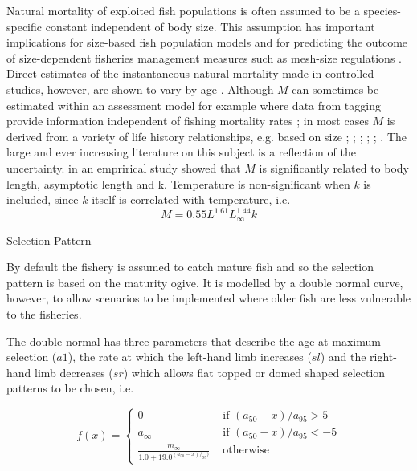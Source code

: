 \documentclass[preprint,review,12pt]{elsarticle}
\begin{document}
Natural mortality of exploited fish populations is often assumed to be a species-specific constant independent of body size. This assumption has important implications for size-based fish population models and for predicting the outcome of size-dependent fisheries management measures such as mesh-size regulations \cite{gislason2010does}. Direct estimates of the instantaneous natural mortality made in controlled studies, however, are shown to vary by age \cite{lorenzen2002density}. Although $M$ can sometimes be estimated within an assessment model for example where data from tagging provide information independent of fishing mortality rates \cite{haist1997integrated}; \cite{pine2003review} in most cases $M$ is derived from a variety of life history relationships, e.g. based on size \cite{jensen1985comparison}; \cite{griffiths2007natural}; \cite{gunderson1988reproductive}; \cite{hoenig1983empirical}; \cite{gunderson1980using}; \cite{hewitt2005comparison}. The large and ever increasing literature on this subject is a reflection of the uncertainty. \cite{gislason2010does} in an emprirical study showed that $M$ is significantly related to body length, asymptotic length and k. Temperature is non-significant when $k$ is included, since $k$ itself is correlated with temperature, i.e.
\begin{equation}
            M =  0.55L^{1.61}L_\infty^{1.44}k
\end{equation} 

Selection Pattern

By default the fishery is assumed to catch mature fish and so the selection pattern is based on the maturity ogive. It is modelled by a double normal curve, however, to allow scenarios to be implemented where older fish are less vulnerable to the fisheries.    

The double normal has three parameters that describe the age at maximum selection ($a1$), the rate at which the left-hand  limb increases ($sl$) and the right-hand limb decreases ($sr$) which allows flat topped or domed shaped selection patterns to be chosen, i.e.
         
\begin{equation}
f(x) = \left\{ \begin{array}{ll}
			0                                 &\mbox{ if $(a_{50}-x)/a_{95} >  5$} \\
			a_\infty                        &\mbox{ if $(a_{50}-x)/a_{95} < -5$} \\
			\frac{m_\infty}{1.0+19.0^{(a_{50}-x)/_{95})}} &\mbox{ otherwise}
		\end{array}
       \right.
\end{equation}
\end{document}
